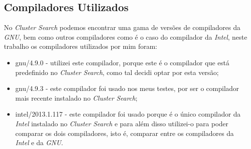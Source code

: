 \documentclass[conference,compsoc]{IEEEtran}
\begin{document}
\subsection{Compiladores Utilizados}
No \textit{Cluster Search} podemos encontrar uma gama de versões de compiladores da \textit{GNU}, bem como outros compiladores como é o caso do compilador da \textit{Intel}, neste trabalho os compiladores utilizados por mim foram:
\begin{itemize}
\item gnu/4.9.0 - utilizei este compilador, porque este é o compilador que está predefinido no \textit{Cluster Search}, como tal decidi optar por esta versão;
\item gnu/4.9.3 - este compilador foi usado nos meus testes, por ser o compilador mais recente instalado no \textit{Cluster Search};
\item intel/2013.1.117 - este compilador foi usado porque é o único compilador da \textit{Intel} instalado no \textit{Cluster Search} e para além disso utilizei-o para poder comparar os dois compiladores, isto é, comparar entre os compiladores da \textit{Intel} e da \textit{GNU}.
\end{itemize}
\end{document}
